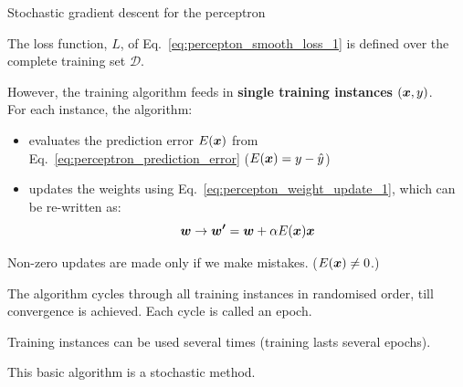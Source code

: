 \begin{frame}[t]{Stochastic gradient descent for the perceptron}

    The \gls{loss function}, $L$, 
    of Eq.~\ref{eq:percepton_smooth_loss_1}
    is defined over the complete training set $\mathcal{D}$.\\
    \vspace{0.3cm}

    However, the training algorithm feeds in 
    {\bf single training instances} $(\boldsymbol{x},y)$.\\
    For each instance, the algorithm:
    \begin{itemize}
        \item evaluates the prediction error $E(\boldsymbol{x})$ 
        from Eq.~\ref{eq:perceptron_prediction_error}
        ($E(\boldsymbol{x}) = y - \hat{y}$)
        \item updates the weights 
        using Eq.~\ref{eq:percepton_weight_update_1}, which can be re-written as:
        \begin{equation}
          \boldsymbol{w} \rightarrow \boldsymbol{w^\prime} = \boldsymbol{w} + \alpha E(\boldsymbol{x}) \boldsymbol{x}
          \label{eq:percepton_weight_update_2}
        \end{equation}
    \end{itemize}

    Non-zero updates are made only if we make mistakes. ($E(\boldsymbol{x}) \ne 0$.)\\
    \vspace{0.3cm}

    The algorithm cycles through all training instances in randomised order, 
    till convergence is achieved. 
    Each cycle is called an \gls{epoch}.\\
    \vspace{0.3cm}
    
    Training instances can be used several times (training lasts several epochs).\\ 
    \vspace{0.3cm}

    This basic algorithm is a 
    \gls{stochastic} 
     method.\\

\end{frame}


%
%
%

